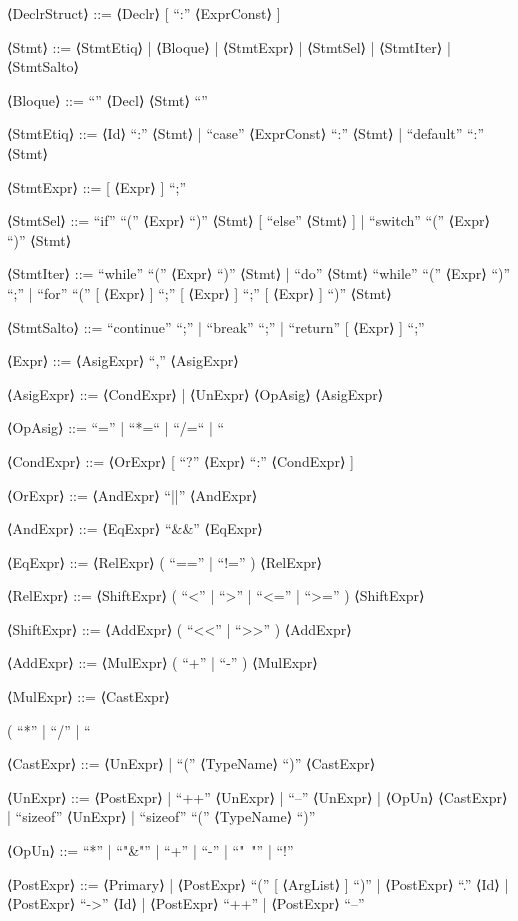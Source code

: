 \documentclass{article}
\begin{document}
\begin{grammar}
⟨DeclrStruct⟩ ::=
    ⟨Declr⟩ [ “:” ⟨ExprConst⟩ ]


⟨Stmt⟩ ::=
      ⟨StmtEtiq⟩
    | ⟨Bloque⟩
    | ⟨StmtExpr⟩
    | ⟨StmtSel⟩
    | ⟨StmtIter⟩
    | ⟨StmtSalto⟩

⟨Bloque⟩ ::=
    “{” { ⟨Decl⟩ } { ⟨Stmt⟩ } “}”

⟨StmtEtiq⟩ ::=
      ⟨Id⟩ “:” ⟨Stmt⟩
    | “case” ⟨ExprConst⟩ “:” ⟨Stmt⟩
    | “default” “:” ⟨Stmt⟩

⟨StmtExpr⟩ ::=
    [ ⟨Expr⟩ ] “;”

⟨StmtSel⟩ ::=
      “if” “(” ⟨Expr⟩ “)” ⟨Stmt⟩ [ “else” ⟨Stmt⟩ ]
    | “switch” “(” ⟨Expr⟩ “)” ⟨Stmt⟩

⟨StmtIter⟩ ::=
      “while” “(” ⟨Expr⟩ “)” ⟨Stmt⟩
    | “do” ⟨Stmt⟩ “while” “(” ⟨Expr⟩ “)” “;”
    | “for” “(” [ ⟨Expr⟩ ] “;” [ ⟨Expr⟩ ] “;” [ ⟨Expr⟩ ] “)” ⟨Stmt⟩

⟨StmtSalto⟩ ::=
    “continue” “;”
    | “break” “;”
    | “return” [ ⟨Expr⟩ ] “;”

⟨Expr⟩ ::=
    ⟨AsigExpr⟩ { “,” ⟨AsigExpr⟩ }

⟨AsigExpr⟩ ::=
      ⟨CondExpr⟩
    | ⟨UnExpr⟩ ⟨OpAsig⟩ ⟨AsigExpr⟩

⟨OpAsig⟩ ::=
    “=” | “*=“ | “/=“ | “%

⟨CondExpr⟩ ::=
    ⟨OrExpr⟩ [ “?” ⟨Expr⟩ “:” ⟨CondExpr⟩ ]

⟨OrExpr⟩ ::=
    ⟨AndExpr⟩ { “||” ⟨AndExpr⟩ }

⟨AndExpr⟩ ::=
    ⟨EqExpr⟩ { “&&” ⟨EqExpr⟩ }

⟨EqExpr⟩ ::=
    ⟨RelExpr⟩ { ( “==” | “!=” ) ⟨RelExpr⟩ }

⟨RelExpr⟩ ::=
    ⟨ShiftExpr⟩ { ( “<” | “>” | “<=” | “>=” ) ⟨ShiftExpr⟩ }

⟨ShiftExpr⟩ ::=
    ⟨AddExpr⟩ { ( “<<” | “>>” ) ⟨AddExpr⟩ }

⟨AddExpr⟩ ::=
    ⟨MulExpr⟩ { ( “+” | “-” ) ⟨MulExpr⟩ }

⟨MulExpr⟩ ::=
    ⟨CastExpr⟩ { ( “*” | “/” | “%

⟨CastExpr⟩ ::=
      ⟨UnExpr⟩
    | “(” ⟨TypeName⟩ “)” ⟨CastExpr⟩

⟨UnExpr⟩ ::=
      ⟨PostExpr⟩
    | “++” ⟨UnExpr⟩
    | “--” ⟨UnExpr⟩
    | ⟨OpUn⟩ ⟨CastExpr⟩
    | “sizeof” ⟨UnExpr⟩
    | “sizeof” “(” ⟨TypeName⟩ “)”

⟨OpUn⟩ ::=
      “*” | “"&"” | “+” | “-” | “"~"” | “!”

⟨PostExpr⟩ ::=
      ⟨Primary⟩
    | ⟨PostExpr⟩ “(” [ ⟨ArgList⟩ ] “)”
    | ⟨PostExpr⟩ “.” ⟨Id⟩
    | ⟨PostExpr⟩ “->” ⟨Id⟩
    | ⟨PostExpr⟩ “++”
    | ⟨PostExpr⟩ “--”

}
\end{grammar}
\end{document}
